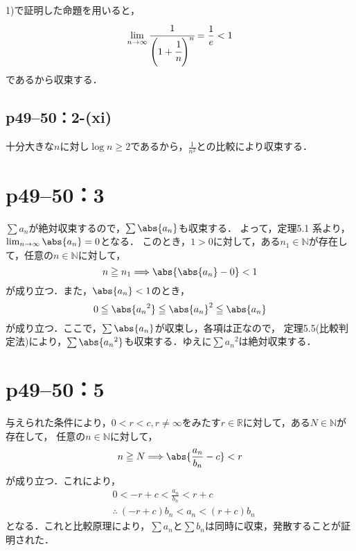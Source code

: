 
\begin{tanswer}
    1)で証明した命題を用いると，
    \[
        \lim _{n \to \infty} \cfrac{1}{\Bigg(1+\cfrac{1}{n}\Bigg)^n} = \frac{1}{e} < 1
    \]
    であるから収束する．
\end{tanswer}


\subsection*{p49--50：2-(xi)}


\begin{tanswer}
    十分大きな$n$に対し$\log n \geq 2$であるから，$\frac{1}{n^2}$との比較により収束する．
\end{tanswer}



\section*{p49--50：3}

\begin{tproof}
    $\sum a_n $が絶対収束するので，$\sum \abs{a_n}$も収束する．
    よって，定理5.1 系より，$\lim_{n \to \infty} \abs{a_n} =0$となる．
    このとき，$1>0$に対して，ある$n_1 \in \mathbb{N}$が存在して，任意の$n \in \mathbb{N}$に対して，
    \[
        n \ge n_1 \Longrightarrow \abs{\abs{a_n} -0}<1
    \]
    が成り立つ．また，$\abs{a_n}<1$のとき，
    \[
        0 \le \abs{{a_n}^2} \le {\abs{a_n}}^2 \le \abs{a_n}
    \]
    が成り立つ．ここで，$\sum \abs{a_n}$が収束し，各項は正なので， 定理5.5(比較判定法)により，$\sum \abs{{a_n}^2}$も収束する．ゆえに$\sum {a_n}^2$は絶対収束する．
\end{tproof}


\section*{p49--50：5}

\begin{tproof}
    与えられた条件により，$0 <r <c , r \ne \infty $をみたす$r \in \mathbb{R}$に対して，ある$N \in \mathbb{N}$が存在して，
    任意の$n \in \mathbb{N}$に対して，
    \[
        n \ge N \Longrightarrow \abs{\frac{a_n}{b_n}-c}<r
    \]
    が成り立つ．これにより，
    \begin{align*}
         & 0<-r +c < \frac{a_n}{b_n} < r+c            \\
         & \therefore ~  (-r+c) b_n < a_n < (r+c) b_n
    \end{align*}
    となる．これと比較原理により，$\sum a_n$と$\sum b_n$は同時に収束，発散することが証明された．
\end{tproof}

